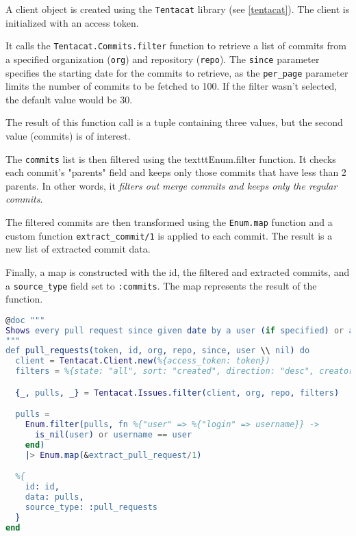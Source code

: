 A client object is created using the \texttt{Tentacat} library (see \ref{tentacat}). The client is initialized with an access token.

It calls the \texttt{Tentacat.Commits.filter} function to retrieve a list of commits from a specified organization (\texttt{org}) and repository (\texttt{repo}). The \texttt{since} parameter specifies the starting date for the commits to retrieve, as the \texttt{per\_page} parameter limits the number of commits to be fetched to 100. If the filter wasn't selected, the default value would be 30. 

The result of this function call is a tuple containing three values, but the second value (commits) is of interest.

The \texttt{commits} list is then filtered using the texttt{Enum.filter function}. It checks each commit's "parents" field and keeps only those commits that have less than 2 parents. In other words, it \textit{filters out merge commits and keeps only the regular commits}.

The filtered commits are then transformed using the \texttt{Enum.map} function and a custom function \texttt{extract\_commit/1} is applied to each commit. The result is a new list of extracted commit data.

Finally, a map is constructed with the id, the filtered and extracted commits, and a \texttt{source\_type} field set to \texttt{:commits}. The map represents the result of the function.\newline


\begin{lstlisting}[language=erlang, caption={Pull requests extraction of extractor\_github.ex}]
@doc """
Shows every pull request since given date by a user (if specified) or all users (if null)
"""
def pull_requests(token, id, org, repo, since, user \\ nil) do
  client = Tentacat.Client.new(%{access_token: token})
  filters = %{state: "all", sort: "created", direction: "desc", creator: user, since: since}

  {_, pulls, _} = Tentacat.Issues.filter(client, org, repo, filters)

  pulls =
    Enum.filter(pulls, fn %{"user" => %{"login" => username}} ->
      is_nil(user) or username == user
    end)
    |> Enum.map(&extract_pull_request/1)

  %{
    id: id,
    data: pulls,
    source_type: :pull_requests
  }
end
\end{lstlisting}

